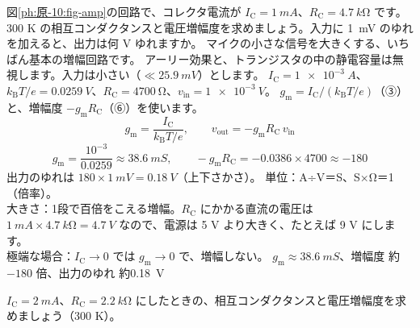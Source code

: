\label{ph:原-10:ex3}
\begin{phreidai}[エミッタ接地の増幅度]
図\ref{ph:原-10:fig-amp}の回路で、コレクタ電流が $I_{\mathrm C}=\qty{1}{mA}$、$R_{\mathrm C}=\qty{4.7}{k\ohm}$ です。300 K の相互コンダクタンスと電圧増幅度を求めましょう。入力に \qty{1}{mV} のゆれを加えると、出力は何 V ゆれますか。
\phbamen
マイクの小さな信号を大きくする、いちばん基本の増幅回路です。
\phmushi
アーリー効果と、トランジスタの中の静電容量は無視します。入力は小さい（$\ll\qty{25.9}{mV}$）とします。
\phzu
$I_{\mathrm C}=\qty{1e-3}{A}$、$k_{\mathrm B}T/e=\qty{0.0259}{V}$、$R_{\mathrm C}=\qty{4700}{\ohm}$、$v_{\mathrm{in}}=\qty{1e-3}{V}$。
\phriyu
$g_{\mathrm m}=I_{\mathrm C}/(k_{\mathrm B}T/e)$（③）と、増幅度 $-g_{\mathrm m}R_{\mathrm C}$（⑥）を使います。
\phtateru
\[ g_{\mathrm m}=\frac{I_{\mathrm C}}{k_{\mathrm B}T/e},\qquad v_{\mathrm{out}}=-g_{\mathrm m}R_{\mathrm C}\,v_{\mathrm{in}} \]
\phtoku
\[ g_{\mathrm m}=\frac{10^{-3}}{0.0259}\approx\qty{38.6}{mS},\qquad -g_{\mathrm m}R_{\mathrm C}=-0.0386\times4700\approx-180 \]
出力のゆれは $180\times\qty{1}{mV}=\qty{0.18}{V}$（上下さかさ）。
\phtashikame
単位：A÷V＝S、S×Ω＝1（倍率）。\\
大きさ：1段で百倍をこえる増幅。$R_{\mathrm C}$ にかかる直流の電圧は $\qty{1}{mA}\times\qty{4.7}{k\ohm}=\qty{4.7}{V}$ なので、電源は 5 V より大きく、たとえば 9 V にします。\\
極端な場合：$I_{\mathrm C}\to0$ では $g_{\mathrm m}\to0$ で、増幅しない。
\kotae $g_{\mathrm m}\approx\qty{38.6}{mS}$、増幅度 約 $-180$ 倍、出力のゆれ 約\qty{0.18}{V}
\end{phreidai}
\begin{jibun}
$I_{\mathrm C}=\qty{2}{mA}$、$R_{\mathrm C}=\qty{2.2}{k\ohm}$ にしたときの、相互コンダクタンスと電圧増幅度を求めましょう（300 K）。
\end{jibun}

